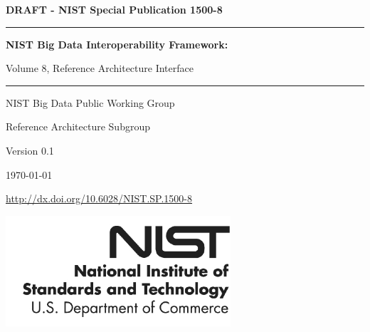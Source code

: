 %
%


\begin{flushright}
{\Large\bf DRAFT - NIST Special Publication 1500-8} 

\bigskip\bigskip

\hrule
\bigskip\bigskip

{\Huge\bf \sf
NIST Big Data Interoperability Framework:

\bigskip

Volume 8, Reference Architecture Interface
}


\bigskip\bigskip
\hrule

\vspace{2cm}

{\large

NIST Big Data Public Working Group

Reference Architecture Subgroup

\vspace{2cm}

Version 0.1

\today

\bigskip
\url{http://dx.doi.org/10.6028/NIST.SP.1500-8}

}
\vspace{2cm}

\vfill

\begin{flushright}
\includegraphics{images/nist.png}
\end{flushright}

\end{flushright}

\newpage

